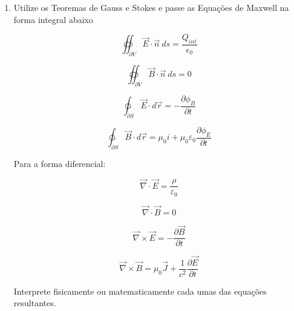 \documentclass[11pt,a4paper]{article}
\begin{document}
\begin{enumerate}
\item Utilize os Teoremas de Gauss e Stokes e passe as Equações de Maxwell na forma integral abaixo

\begin{equation}
\oiint_{\partial V} \vec{E} \cdot \vec{n} \ ds  =\frac{Q_{int}}{\epsilon_0} 
\end{equation}

\begin{equation}
\oiint_{\partial V} \vec{B} \cdot \vec{n} \ ds  = 0  
\end{equation}

\begin{equation}
\ointctrclockwise_{\partial S} \vec{E} \cdot d\vec{r} = - \frac{\partial \phi _B }{\partial t}
\end{equation}

\begin{equation}
\ointctrclockwise_{\partial S} \vec{B} \cdot d\vec{r} = \mu_0i + \mu_0\varepsilon_0\frac{\partial \phi _E }{\partial t}
\end{equation}

Para a forma diferencial:

\begin{equation}
\vec{\nabla} \cdot \vec{E} = \displaystyle\frac{\rho}{\varepsilon_0}
\end{equation}

\begin{equation}
\vec{\nabla} \cdot \vec{B} = 0
\end{equation}

\begin{equation}
\vec{\nabla} \times \vec{E} = - \frac{\partial \vec{B}}{\partial t}
\end{equation}

\begin{equation}
\vec{\nabla} \times \vec{B} = \mu_0 \vec{J}  + \frac{1}{c^2}\frac{\partial \vec{E}}{\partial t}
\end{equation}

Interprete fisicamente ou matematicamente cada umas das equações resultantes.

\end{enumerate}
	
\end{document}
